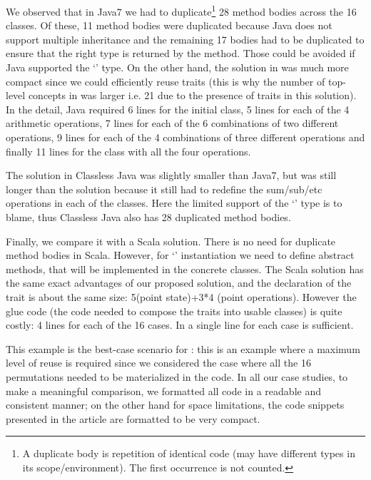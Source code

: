 \noindent We observed that in Java7 we had to duplicate\footnote{A duplicate body is repetition of identical code (may have different types in its scope/environment). The first occurrence is not counted. } 28 method bodies across the 16 classes.
Of these, 11 method bodies were duplicated because Java does not support multiple inheritance
 and the remaining 17 bodies had to be duplicated to ensure that the right type
 is returned by the method. Those could be avoided if Java supported
 the `\Q@This@' type.
 On the other hand, the solution in \name was much more compact since we could efficiently
reuse traits (this is why the number of top-level concepts in \name was larger i.e. 21 due to the
 presence of traits in this solution).
In the detail, Java required 6 lines for the initial \Q@Point@ class,
5 lines for each of the 4 arithmetic operations, 7 lines for each of the 6 combinations
of two different operations, 9 lines for each of the 4 combinations of three different 
operations and finally 11 lines for the class with all the four operations.


 The solution in Classless Java was slightly smaller than Java7,
 but was still longer than the \name solution because it still had to redefine the
 sum/sub/etc operations in each of the classes. Here the limited
 support of the `\Q@This@' type is to blame, thus Classless Java also has 28 duplicated method bodies.

Finally, we compare it with a Scala solution.
There is no need for duplicate method bodies in Scala.
However, for `\Q@This@' instantiation we need to define abstract methods, that will be implemented in the concrete classes.
The Scala solution has the same exact advantages
of our proposed solution, and the declaration
of the trait is about the same size: 
5(point state)+3*4 (point operations).
However the glue code (the code needed to compose the traits into usable classes) is quite costly:
4 lines for each of the 16 cases.
In \name a single line for each case is sufficient.

This example is the best-case scenario for \name: this is an example where a maximum level of reuse
 is required since we considered the case where all the 16 permutations needed to be materialized in the code.
In all our case studies, to make a meaningful comparison, we formatted all code in a readable and consistent manner;
on the other hand for space limitations, the code snippets presented in the article
are formatted to be very compact.


